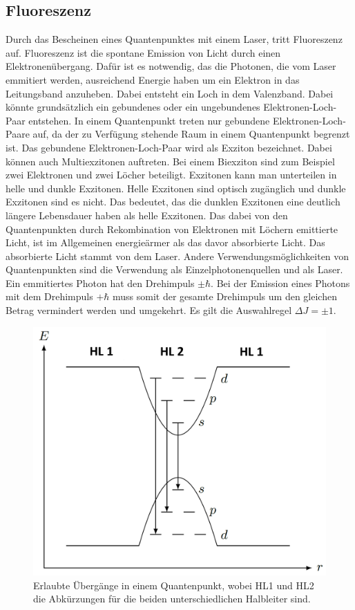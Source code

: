 \subsection{Fluoreszenz}
Durch das Bescheinen eines Quantenpunktes mit einem Laser, tritt Fluoreszenz auf. Fluoreszenz ist die spontane Emission von Licht durch einen Elektronenübergang. Dafür ist es notwendig, das die Photonen, die vom Laser emmitiert werden, ausreichend  Energie haben um ein Elektron in das Leitungsband anzuheben. Dabei entsteht ein Loch in dem Valenzband. Dabei könnte grundsätzlich  ein gebundenes oder ein ungebundenes Elektronen-Loch-Paar entstehen. 
In einem Quantenpunkt treten nur gebundene Elektronen-Loch-Paare auf, da der zu Verfügung stehende  Raum in einem Quantenpunkt begrenzt ist.
 Das gebundene Elektronen-Loch-Paar wird als Exziton bezeichnet. Dabei können auch Multiexzitonen auftreten. Bei einem Biexziton sind zum Beispiel zwei Elektronen und zwei Löcher beteiligt. 
 Exzitonen kann man unterteilen in helle und dunkle Exzitonen. 
 Helle Exzitonen  sind optisch zugänglich und dunkle Exzitonen sind es nicht. 
 Das bedeutet, das die dunklen Exzitonen eine deutlich längere Lebensdauer haben als helle Exzitonen. 
 Das dabei von den Quantenpunkten durch Rekombination von Elektronen mit Löchern emittierte Licht, ist im Allgemeinen energieärmer als das davor absorbierte Licht. Das absorbierte Licht stammt von dem Laser. 
 Andere Verwendungsmöglichkeiten von  Quantenpunkten sind die Verwendung als Einzelphotonenquellen und als Laser.
 Ein emmitiertes Photon hat den Drehimpuls $\pm \hbar$. Bei der Emission eines Photons  mit dem Drehimpuls $+ \hbar$ muss somit der gesamte Drehimpuls um den gleichen Betrag vermindert werden und umgekehrt. Es gilt die Auswahlregel $ \Delta J = \pm 1$.
 \begin{figure}[H]
\centering
\includegraphics[scale=0.3]{QP_Energie.PNG}
\caption{Erlaubte Übergänge in einem Quantenpunkt, wobei HL1 und HL2 die Abkürzungen für die beiden unterschiedlichen Halbleiter sind.}
\label{fig:QP_Energien}
\end{figure}
